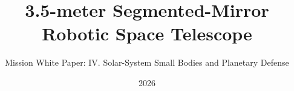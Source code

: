\title{3.5-meter Segmented-Mirror Robotic Space Telescope}
\newcommand{\wpvolumelabel}{IV}
\newcommand{\wpvolumetitle}{Solar-System Small Bodies and Planetary Defense}
\subtitle{Mission White Paper: \wpvolumelabel. \wpvolumetitle}
\newcommand{\wpauthors}{Juhan Kim, Yong-Woo Kang, Sang Hyun Lee, Jeong-Yeol Han, Sungwook E. Hong, Bongkon Moon, Donguk Song, Juhyung Kang, Myeong-Gu Park, Sang Chul Kim, Chung-Uk Lee, Sangmo Tony Sohn, Arman Shafieloo, David Parkinson, Hong Soo Park, Dohyeong Kim, Chan Park, Jungjoo Sohn, Young-Beom Jeon, Jong-Hak Woo, Hyung Mok Lee, Hong Bae Ann, Myungkook James Jee, Mansoo Choi, Changbom Park}
\date{2026}
\newcommand{\wpchapteroffset}{2}
\newcommand{\MakeVolumeBody}{%
  \definecolor{Blue1}{HTML}{C89562}%
  \definecolor{Blue2}{HTML}{A4612E}%
  \definecolor{Blue3}{HTML}{713F24}%
  }
